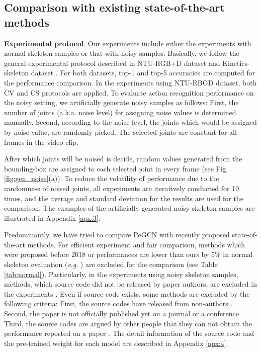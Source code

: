\documentclass[runningheads]{llncs}
\newcommand{\eg}{\textit{e}.\textit{g}. }
\begin{document}
\subsection{Comparison with existing state-of-the-art methods}
\textbf{Experimental protocol}. Our experiments include either the experiments with normal skeleton samples or that with noisy samples. Basically, we follow the general experimental protocol described in NTU-RGB+D dataset \cite{shahroudy2016ntu} and Kinetics-skeleton dataset \cite{kay2017kinetics}. For both datasets, top-1 and top-5 accuracies are computed for the performance comparison. In the experiments using NTU-RBGD dataset, both CV and CS protocols are applied. To evaluate action recognition performance on the noisy setting, we artificially generate noisy samples as follows: First, the number of joints (a.k.a. noise level) for assigning noise values is determined manually. Second, according to the noise level, the joints which would be assigned by noise value, are randomly picked.  The selected joints are constant for all frames in the video clip. 

After which joints will be noised is decide, random values generated from the bounding-box are assigned to each selected joint in every frame (see Fig. \ref{fig:gen_noise}(a)). To reduce the volatility of performance due to the randomness of noised joints, all experiments are iteratively conducted for 10 times, and the average and standard deviation for the results are used for the comparison. The examples of the artificially generated noisy skeleton samples are illustrated in Appendix \ref{apx:3}.

Predominantly, we have tried to compare PeGCN with recently proposed state-of-the-art methods. For efficient experiment and fair comparison, methods which were proposed before 2018 or performances are lower than ours by 5\% in normal skeleton evaluation (\eg \cite{fernando2015modeling,du2015hierarchical,shahroudy2016ntu,liu2016spatio,zhang2017view}) are excluded for the comparison (see Table \ref{tab:normal}). Particularly, in the experiments using noisy skeleton samples, methods, which source code did not be released by paper authors, are excluded in the experiments \cite{shi2019skeleton,peng2019learning}. Even if source code exists, some methods are excluded by the following criteria: First, the source codes have released from non-authors \cite{shi2019skeleton}. Second, the paper is not officially published yet on a journal or a conference \cite{peng2019learning}. Third, the source codes are argued by other people that they can not obtain the performance reported on a paper \cite{shi2019skeleton}. The detail information of the source code and the pre-trained weight for each model are described in Appendix \ref{apx:4}. 
\end{document}
